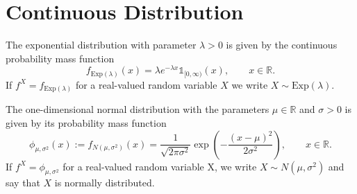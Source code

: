 \section{Continuous Distribution}

\begin{definition}
    The exponential distribution with parameter \(\lambda > 0\) is given by the continuous probability mass function
    \begin{equation}
        f_{\text{Exp}(\lambda)}(x) = \lambda e^{-\lambda x} \mathds{1}_{[0, \infty)}(x), \qquad x \in \mathbb{R} \text{.}
    \end{equation}
    If \(f^X = f_{\text{Exp}(\lambda)}\) for a real-valued random variable \(X\) we write \(X \sim \text{Exp}(\lambda)\).
\end{definition}

\begin{definition}
    The one-dimensional normal distribution with the parameters \(\mu \in \mathbb{R}\) and \(\sigma > 0\) is given by its probability mass function
    \begin{equation}
        \phi_{\mu, \sigma^2} (x) := f_{N(\mu, \sigma^2)}(x) = \frac{1}{\sqrt{2 \pi \sigma^2}} \exp \left( - \frac{(x - \mu)^2}{2 \sigma^2}\right), \qquad x \in \mathbb{R} \text{.}
    \end{equation}
    If \(f^X = \phi_{\mu, \sigma^2}\) for a real-valued random variable X, we write \(X \sim N(\mu, \sigma^2)\) and say that \(X\) is normally distributed.
\end{definition}

\begin{lemma}
\end{lemma}